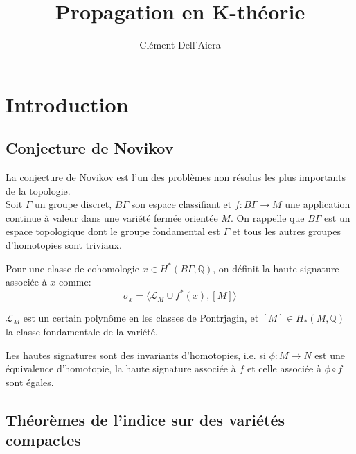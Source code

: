 \documentclass{beamer}
\title{Propagation en K-théorie}
\author{Clément Dell'Aiera}\institute{Université de Lorraine}
\begin{document}
\begin{frame}
\titlepage
\end{frame}

\section{Introduction}

\subsection{Conjecture de Novikov}

\begin{frame}
La conjecture de Novikov est l'un des problèmes non résolus les plus importants de la topologie.\\
Soit $\Gamma$ un groupe discret, $B\Gamma$ son espace classifiant et $f: B\Gamma\rightarrow M$ une application continue à valeur dans une variété fermée orientée $M$. On rappelle que $B\Gamma$ est un espace topologique dont le groupe fondamental est $\Gamma$ et tous les autres groupes d'homotopies sont triviaux. \\
\begin{definition}
Pour une classe de cohomologie $x\in H^*(B\Gamma,\mathbb Q)$, on définit la haute signature associée à $x$ comme:
\[\sigma_x = \langle \mathcal L_M \cup f^*(x), [M]\rangle\] 
\end{definition}

$\mathcal L_M$ est un certain polynôme en les classes de Pontrjagin, et $[M]\in H_*(M,\mathbb Q)$ la classe fondamentale de la variété.
\end{frame}

\begin{frame}
\begin{conj}[Novikov]
Les hautes signatures sont des invariants d'homotopies, i.e. si $\phi : M\rightarrow N$ est une équivalence d'homotopie, la haute signature associée à $f$ et celle associée à $\phi\circ f$ sont égales.
\end{conj}
\end{frame}

\subsection{Théorèmes de l'indice sur des variétés compactes}
\end{document}
